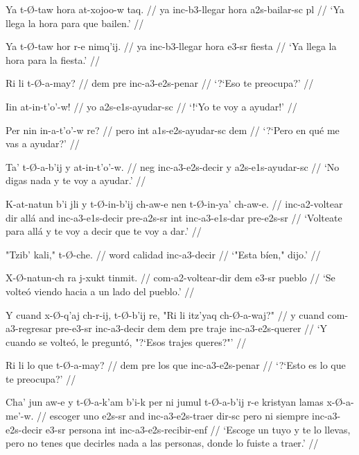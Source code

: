 \documentclass[12pt]{article}
\begin{document}
\ex
\begingl
  \gla  Ya t-\O-taw hora at-xojoo-w taq. //
  \glb ya inc-b3-llegar hora a2s-bailar-sc pl //
  \glft `Ya llega la hora para que bailen.' //
\endgl
\xe

\ex
\begingl
  \gla  Ya t-\O-taw hor r-e nimq'ij. //
  \glb ya inc-b3-llegar hora e3-sr fiesta //
  \glft `Ya llega la hora para la fiesta.' //
\endgl
\xe

\ex
\begingl
  \gla  Ri li t-\O-a-may? //
  \glb dem pre inc-a3-e2s-penar //
  \glft `?`Eso te preocupa?' //
\endgl
\xe

\ex
\begingl
  \gla Iin at-in-t'o'-w! //
  \glb yo a2s-e1s-ayudar-sc //
  \glft `!`Yo te voy a ayudar!' //
\endgl
\xe

\ex
\begingl
  \gla Per nin in-a-t'o'-w re? //
  \glb pero int a1s-e2s-ayudar-sc dem //
  \glft `?`Pero en qu\'e me vas a ayudar?' //
\endgl
\xe

\ex
\begingl
  \gla  Ta' t-\O-a-b'ij y at-in-t'o'-w. //
  \glb neg inc-a3-e2s-decir y a2s-e1s-ayudar-sc //
  \glft `No digas nada y te voy a ayudar.' //
\endgl
\xe

\ex
\begingl
  \gla K-at-natun b'i jli y t-\O-in-b'ij ch-aw-e nen t-\O-in-ya' ch-aw-e. //
  \glb inc-a2-voltear dir all\'a and inc-a3-e1s-decir pre-a2s-sr int inc-a3-e1s-dar pre-e2s-sr //
  \glft `Volteate para all\'a y te voy a decir que te voy a dar.' //
\endgl
\xe

\ex
\begingl
  \gla  "Tzib' kali," t-\O-che. //
  \glb word calidad inc-a3-decir //
  \glft `"Esta b\'ien," dijo.' //
\endgl
\xe

\ex
\begingl
  \gla  X-\O-natun-ch ra j-xukt tinmit. //
  \glb com-a2-voltear-dir dem e3-sr pueblo //
  \glft `Se volte\'o viendo hacia a un lado del pueblo.' //
\endgl
\xe

\ex
\begingl
  \gla  Y cuand x-\O-q'aj ch-r-ij, t-\O-b'ij re, "Ri li itz'yaq ch-\O-a-waj?" //
  \glb  y cuand com-a3-regresar pre-e3-sr inc-a3-decir dem dem pre traje inc-a3-e2s-querer //
  \glft `Y cuando se volte\'o, le pregunt\'o, "?`Esos trajes queres?"' //
\endgl
\xe

\ex
\begingl
  \gla  Ri li lo que t-\O-a-may? //
  \glb dem pre los que inc-a3-e2s-penar //
  \glft `?`Esto es lo que te preocupa?' //
\endgl
\xe

\ex
\begingl
  \gla Cha' jun aw-e y t-\O-a-k'am b'i-k per ni jumul t-\O-a-b'ij r-e kristyan lamas x-\O-a-me'-w. //
  \glb escoger uno e2s-sr and inc-a3-e2s-traer dir-sc pero ni siempre inc-a3-e2s-decir e3-sr persona int inc-a3-e2s-recibir-enf //
  \glft `Escoge un tuyo y te lo llevas, pero no tenes que decirles nada a las personas, donde lo fuiste a traer.' //
\endgl
\xe
\end{document}
